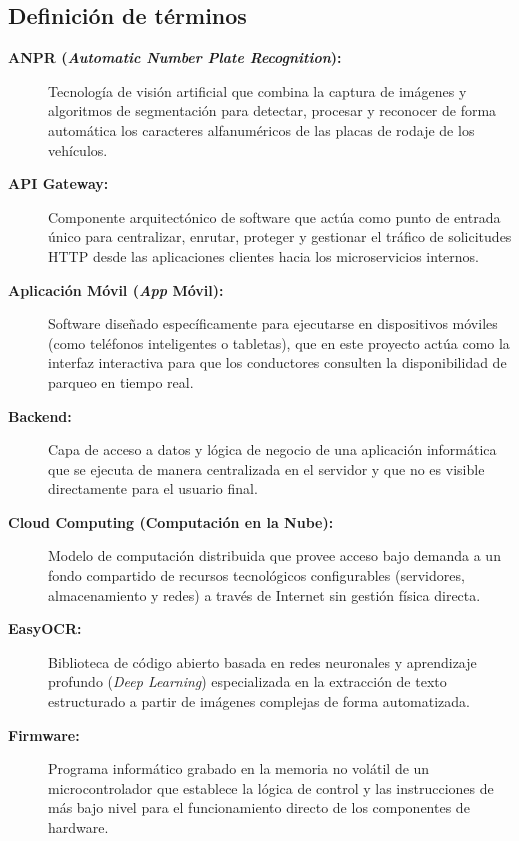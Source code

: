 \documentclass[12pt,a4paper]{article}
\begin{document}
\subsection{Definición de términos}

\begin{description}
	\item[\textbf{ANPR (\textit{Automatic Number Plate Recognition}):}] Tecnología de visión artificial que combina la captura de imágenes y algoritmos de segmentación para detectar, procesar y reconocer de forma automática los caracteres alfanuméricos de las placas de rodaje de los vehículos.
	
	\item[\textbf{API Gateway:}] Componente arquitectónico de software que actúa como punto de entrada único para centralizar, enrutar, proteger y gestionar el tráfico de solicitudes HTTP desde las aplicaciones clientes hacia los microservicios internos.
	
	\item[\textbf{Aplicación Móvil (\textit{App} Móvil):}] Software diseñado específicamente para ejecutarse en dispositivos móviles (como teléfonos inteligentes o tabletas), que en este proyecto actúa como la interfaz interactiva para que los conductores consulten la disponibilidad de parqueo en tiempo real.
	
	\item[\textbf{Backend:}] Capa de acceso a datos y lógica de negocio de una aplicación informática que se ejecuta de manera centralizada en el servidor y que no es visible directamente para el usuario final.
	
	\item[\textbf{Cloud Computing (Computación en la Nube):}] Modelo de computación distribuida que provee acceso bajo demanda a un fondo compartido de recursos tecnológicos configurables (servidores, almacenamiento y redes) a través de Internet sin gestión física directa.
	
	\item[\textbf{EasyOCR:}] Biblioteca de código abierto basada en redes neuronales y aprendizaje profundo (\textit{Deep Learning}) especializada en la extracción de texto estructurado a partir de imágenes complejas de forma automatizada.
	
	\item[\textbf{Firmware:}] Programa informático grabado en la memoria no volátil de un microcontrolador que establece la lógica de control y las instrucciones de más bajo nivel para el funcionamiento directo de los componentes de hardware.
	

\end{description}
\end{document}
